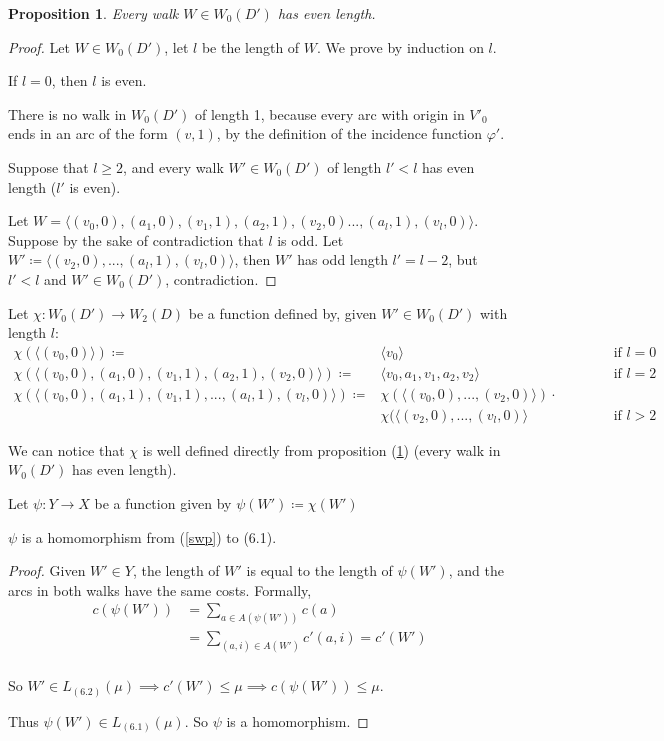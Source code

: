 \documentclass[a4paper,10pt, leqno]{article}
\let\oldref\ref
\renewcommand{\ref}[1]{(\oldref{#1})}
\begin{document}
\newtheorem{proposition}[lemma]{Proposition}
\begin{proposition} \label{prop1}
    Every walk $W \in W_0(D')$ has even length.
\end{proposition}
\begin{proof}
Let $W \in W_0(D')$, let $l$ be the length of $W$.
We prove by induction on $l$.
   
If $l = 0$, then $l$ is even.

There is no walk in $W_0(D')$ of length 1, because every arc with origin in $V'_0$ ends in an arc of the form $(v, 1)$, by the definition of the incidence function $\varphi'$.
   
Suppose that $l \geq 2$, and every walk $W' \in W_0(D')$ of length $l' < l$ has even length ($l'$ is even). 

Let $W = \langle (v_0, 0), (a_1, 0), (v_1, 1), (a_2, 1), (v_2, 0) ..., (a_l, 1), (v_l, 0) \rangle$. Suppose by the sake of contradiction that $l$ is odd. Let $ W' \coloneqq \langle (v_2, 0), ..., (a_l, 1), (v_l, 0) \rangle$, then $W'$ has odd length $l' = l - 2$, but $l' < l$ and $W' \in W_0(D')$, contradiction.
    
\end{proof}


Let $\chi : W_0(D') \to W_2(D)$ be a function defined by, given $W' \in W_0(D')$ with length $l$: 
\begin{align*}
\chi(\langle (v_0, 0) \rangle) \coloneqq& \langle v_0 \rangle & & & & & \text{if } l = 0 \\
\chi(\langle (v_0, 0), (a_1, 0), (v_1, 1), (a_2, 1), (v_2, 0) \rangle) \coloneqq& \langle v_0, a_1, v_1, a_2, v_2\rangle  & & & & & \text{if } l = 2 \\
\chi(\langle (v_0, 0), (a_1, 1), (v_1, 1), ..., (a_l, 1), (v_l, 0)\rangle) \coloneqq& \chi(\langle (v_0, 0), ..., (v_2, 0) \rangle) \cdotp \\ & \chi(\langle (v_2, 0), ..., (v_l, 0)\rangle & & & & & \text{if } l > 2
\end{align*}

We can notice that $\chi$ is well defined directly from proposition \ref{prop1} (every walk in $W_0(D')$ has even length).

Let $\psi : Y \to X$ be a function given by $\psi(W') \coloneqq \chi(W')$ 
\begin{lemma}
    \label{homo2}
    $\psi$ is a homomorphism from \ref{swp} to (6.1). 
\end{lemma}
\begin{proof}
    Given $W' \in Y$, the length of $W'$ is equal to the length of $\psi(W')$, and the arcs in both walks have the same costs.
    Formally,
    \begin{align*}c(\psi(W')) &= \sum_{a \in A(\psi(W'))}{c(a)}  \\
    &= \sum_{(a, i) \in A(W')}{c'(a, i)}
    = c'(W') \\
    \end{align*}
    
    So $W' \in L_{(6.2)}(\mu) \implies c'(W') \leq \mu \implies c(\psi(W')) \leq \mu$.
    
    Thus $\psi(W') \in L_{(6.1)}(\mu)$. So $\psi$ is a homomorphism.
\end{proof}
\end{document}
